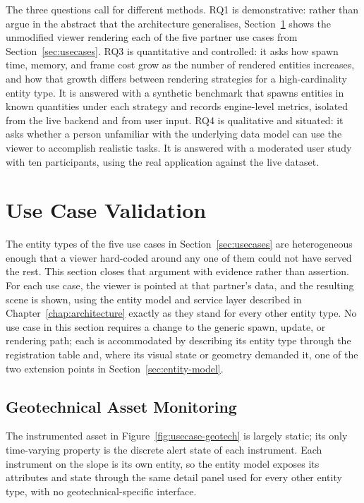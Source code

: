 The three questions call for different methods. RQ1 is demonstrative: rather than argue in the abstract that the architecture generalises, Section~\ref{sec:eval-usecases} shows the unmodified viewer rendering each of the five partner use cases from Section~\ref{sec:usecases}. RQ3 is quantitative and controlled: it asks how spawn time, memory, and frame cost grow as the number of rendered entities increases, and how that growth differs between rendering strategies for a high-cardinality entity type. It is answered with a synthetic benchmark that spawns entities in known quantities under each strategy and records engine-level metrics, isolated from the live backend and from user input. RQ4 is qualitative and situated: it asks whether a person unfamiliar with the underlying data model can use the viewer to accomplish realistic tasks. It is answered with a moderated user study with ten participants, using the real application against the live dataset.

\section{Use Case Validation}
\label{sec:eval-usecases}

The entity types of the five use cases in Section~\ref{sec:usecases} are heterogeneous enough that a viewer hard-coded around any one of them could not have served the rest. This section closes that argument with evidence rather than assertion. For each use case, the viewer is pointed at that partner's data, and the resulting scene is shown, using the entity model and service layer described in Chapter~\ref{chap:architecture} exactly as they stand for every other entity type. No use case in this section requires a change to the generic spawn, update, or rendering path; each is accommodated by describing its entity type through the registration table and, where its visual state or geometry demanded it, one of the two extension points in Section~\ref{sec:entity-model}.

\subsection{Geotechnical Asset Monitoring}

The instrumented asset in Figure~\ref{fig:usecase-geotech} is largely static; its only time-varying property is the discrete alert state of each instrument. Each instrument on the slope is its own entity, so the entity model exposes its attributes and state through the same detail panel used for every other entity type, with no geotechnical-specific interface.

